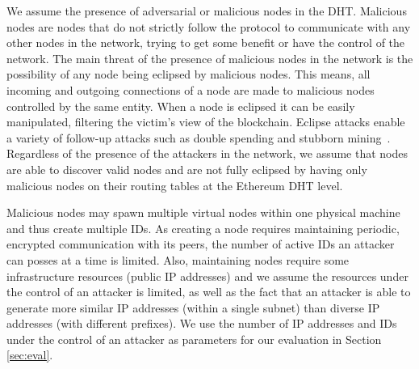 We assume the presence of adversarial or malicious nodes in the DHT. 
Malicious nodes are nodes that do not strictly follow the protocol to communicate with any other nodes in the network, trying to get some benefit or have the control of the network.
The main threat of the presence of malicious nodes in the network is the possibility of any node being eclipsed by malicious nodes.
This means, all incoming and outgoing connections of a node are made to malicious nodes controlled by the same entity. 
When a node is eclipsed it can be easily manipulated,
filtering the victim’s view of the blockchain.  
Eclipse attacks
enable a variety of follow-up attacks such as double spending
and stubborn mining~\cite{stubborn}.
Regardless of the presence of the attackers in the network, 
we assume that nodes are able to discover valid nodes and are not fully eclipsed by having only malicious nodes on their routing tables at the Ethereum DHT level.
%

Malicious nodes may spawn multiple virtual nodes within one physical machine and thus create multiple IDs. 
As creating a node requires maintaining periodic,  encrypted communication with its peers, the number of active IDs an attacker can posses at a time is limited. 
Also,  maintaining nodes require some infrastructure resources (public IP addresses) and we assume the resources under the control of an attacker is limited, as well as the fact 
that an attacker is able to generate more similar IP addresses (within a single subnet) than diverse IP addresses (with different prefixes). 
We use the number of IP addresses and IDs under the control of an attacker as parameters for our evaluation in Section \ref{sec:eval}.



